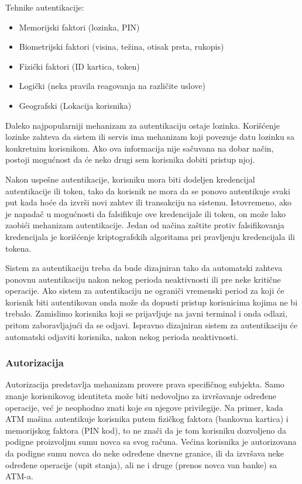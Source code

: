 \documentclass[a4paper]{article}
\begin{document}
Tehnike autentikacije: 
    \begin{itemize}
        \item Memorijski faktori (lozinka, PIN)
        \item  Biometrijski faktori (visina, težina, otisak prsta, rukopis)
        \item Fizički faktori (ID kartica, token)
        \item Logički (neka pravila reagovanja na različite uslove)                                    
        \item Geografski (Lokacija korisnika)                                
    \end{itemize}

Daleko najpopularniji mehanizam za autentikaciju ostaje lozinka. Korišćenje lozinke zahteva da sistem ili servis 
ima mehanizam koji povezuje datu lozinku sa konkretnim korisnikom. Ako ova informacija nije sačuvana na dobar 
način, postoji mogućnost da će neko drugi sem korisnika dobiti pristup njoj.

Nakon uspešne autentikacije, korisniku mora biti 
dodeljen kredencijal autentikacije ili token, tako da korisnik 
ne mora da se ponovo autentikuje svaki put kada hoće da izvrši novi zahtev ili transakciju na sistemu. 
Istovremeno, ako je napadač u mogućnosti da falsifikuje ove kredencijale ili token, on može lako zaobići 
mehanizam autentikacije. Jedan od načina zaštite protiv falsifikovanja kredencijala je korišćenje 
kriptografskih algoritama pri pravljenju kredencijala ili tokena.\cite{Top10}

Sistem za autentikaciju treba da bude dizajniran tako da automatski zahteva ponovnu autentikaciju nakon nekog 
perioda neaktivnosti ili pre neke kritične operacije.
Ako sistem za autentikaciju ne ograniči vremenski period za koji će korisnik biti autentikovan onda može 
da dopusti pristup korisnicima kojima ne bi trebalo. Zamislimo korisnika koji se prijavljuje na javni terminal
i onda odlazi, pritom zaboravljajući da se odjavi. Ispravno dizajniran sistem za autentikaciju 
će automatski odjaviti korisnika, nakon nekog perioda neaktivnosti.

\subsubsection{Autorizacija}
Autorizacija predstavlja mehanizam provere prava specifičnog subjekta.
Samo znanje korisnikovog identiteta može biti nedovoljno za izvršavanje određene operacije, već je neophodno znati koje su njegove privilegije.
Na primer, kada ATM mašina autentikuje korisnika putem fizičkog faktora (bankovna kartica) i memorijskog faktora (PIN kod),
to ne znači da je tom korisniku dozvoljeno da podigne proizvoljnu sumu novca sa svog računa. Većina korisnika je autorizovana 
da podigne sumu novca do neke određene dnevne granice, ili da izvršava neke određene operacije (upit stanja), 
ali ne i druge (prenos novca van banke) sa ATM-a.
 
\end{document}
